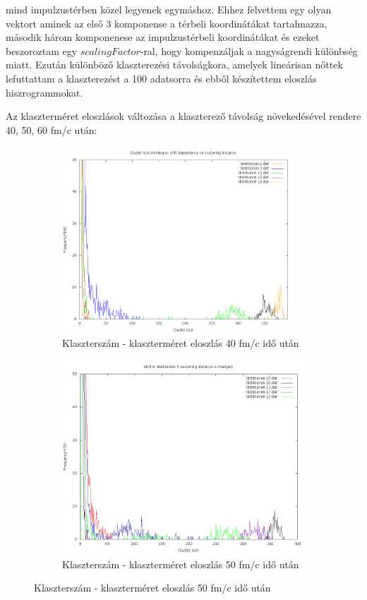 \documentclass[a4paper,12pt]{article}
\begin{document}
mind impulzustérben közel legyenek egymáshoz. Ehhez felvettem egy olyan vektort aminek az első 3 komponense a térbeli koordinátákat tartalmazza,
második három komponenese az impulzustérbeli koordinátákat és ezeket beszoroztam egy $scalingFactor$-ral, hogy kompenzáljak a nagyságrendi különbség
miatt. Ezután különböző klaszterezési távolságkora, amelyek lineárisan nőttek lefuttattam a klaszterezést a 100 adatsorra és ebből készítettem eloszlás
hiszrogrammokat.
\par Az klaszterméret eloszlások változása a klaszterező távolság növekedésével rendere 40, 50, 60 fm/c után:
\begin{figure}[H]
	\centering
	\begin{subfigure}{.45\textwidth}
		\includegraphics[width=0.96\textwidth]{ShiftInDistro80.png}
		\caption{ Klaszterszám - klaszterméret eloszlás 40 fm/c idő után }
	\end{subfigure}
	\begin{subfigure}{.45\textwidth}
		\includegraphics[width=.96\textwidth]{ShiftInDistro100.png}
		\caption{ Klaszterszám - klaszterméret eloszlás 50 fm/c idő után} 
	\end{subfigure}
\end{figure}
\end{document}

